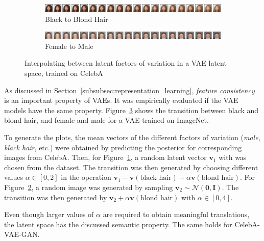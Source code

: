 \begin{figure}
    \centering
    \begin{subfigure}{\textwidth}
        \includegraphics[width=\textwidth]{images/latent_space_traversals/vae_celeba_black_to_blond.png}
        \caption{Black to Blond Hair}
        \label{subfig:black_to_blond}
    \end{subfigure}
    \begin{subfigure}{\textwidth}
        \includegraphics[width=\textwidth]{images/latent_space_traversals/vae_celeba_man_to_woman.png}
        \caption{Female to Male}
        \label{subfig:female_to_male}
    \end{subfigure}
    \caption[Interpolating between black and blond hair, man and woman]{Interpolating between latent factors of variation in a VAE latent space, trained on CelebA}
    \label{fig:vae_celeba_black_to_blond_man_to_woman}
\end{figure}

As discussed in Section~\ref{subsubsec:representation_learning}, \textit{feature consistency} is an important property of \acp{VAE}.
It was empirically evaluated if the \ac{VAE} models have the same property.
Figure~\ref{fig:vae_celeba_black_to_blond_man_to_woman} shows the transition between black and blond hair, and female and male for a \ac{VAE} trained on ImageNet.

To generate the plots, the mean vectors of the different factors of variation (\textit{male}, \textit{black hair}, etc.) were obtained by predicting the posterior for corresponding images from CelebA.
Then, for Figure~\ref{subfig:black_to_blond}, a random latent vector $\bm{v}_1$ with  was chosen from the dataset.
The transition was then generated by choosing different values $\alpha \in [0, 2]$ in the operation $\bm{v}_1 - \bm{v}(\text{black hair}) + \alpha\bm{v}(\text{blond hair})$.
For Figure~\ref{subfig:female_to_male}, a random image was generated by sampling $\bm{v}_2\sim \mathcal{N}(\bm{0}, \bm{I})$.
The transition was then generated by $\bm{v}_2 + \alpha\bm{v}(\text{blond hair})$ with $\alpha \in [0, 4]$.

Even though larger values of $\alpha$ are required to obtain meaningful translations, the latent space has the discussed semantic property.
The same holds for CelebA-\ac{VAE}-\ac{GAN}.

